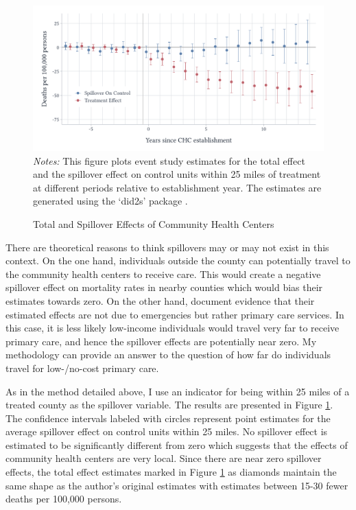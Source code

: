 \begin{figure}[tb!]
  \caption{Total and Spillover Effects of Community Health Centers}
  \label{fig:chc_es_spill}
    
  {\centering
    \includegraphics[width=\textwidth]{figures/spatial-spillovers/chc/chc-es_combined.pdf}
  }
  {\footnotesize
    \textit{Notes:} This figure plots event study estimates for the total effect and the spillover effect on control units within 25 miles of treatment at different periods relative to establishment year. The estimates are generated using the `did2s' package \citep{did2s}. 
  }
\end{figure}

There are theoretical reasons to think spillovers may or may not exist in this context. On the one hand, individuals outside the county can potentially travel to the community health centers to receive care. This would create a negative spillover effect on mortality rates in nearby counties which would bias their estimates towards zero. On the other hand, \citet{Bailey_Goodman_Bacon_2015} document evidence that their estimated effects are not due to emergencies but rather primary care services. In this case, it is less likely low-income individuals would travel very far to receive primary care, and hence the spillover effects are potentially near zero. My methodology can provide an answer to the question of how far do individuals travel for low-/no-cost primary care.

As in the method detailed above, I use an indicator for being within 25 miles of a treated county as the spillover variable. The results are presented in Figure \ref{fig:chc_es_spill}. The confidence intervals labeled with circles represent point estimates for the average spillover effect on control units within 25 miles. No spillover effect is estimated to be significantly different from zero which suggests that the effects of community health centers are very local. Since there are near zero spillover effects, the total effect estimates marked in Figure \ref{fig:chc_es_spill} as diamonds maintain the same shape as the author's original estimates with estimates between 15-30 fewer deaths per 100,000 persons. 


